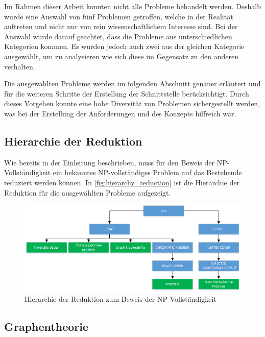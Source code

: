 Im Rahmen dieser Arbeit konnten nicht alle Probleme behandelt werden. Deshalb wurde eine Auswahl von fünf Problemen getroffen, welche in der Realität auftreten und nicht nur von rein 
wissenschaftlichem Interesse sind. Bei der Auswahl wurde darauf geachtet, dass die Probleme aus unterschiedlichen Kategorien kommen. Es wurden jedoch auch zwei aus der gleichen 
Kategorie ausgewählt, um zu analysieren wie sich diese im Gegensatz zu den anderen verhalten. 

Die ausgewählten Probleme werden im folgenden Abschnitt genauer erläutert und für die weiteren Schritte der Erstellung der Schnittstelle berücksichtigt. Durch dieses Vorgehen konnte eine 
hohe Diversität von Problemen sichergestellt werden, was bei der Erstellung der Anforderungen und des Konzepts hilfreich war.

\subsection{Hierarchie der Reduktion}\label{hierarchy_reduction}
Wie bereits in der Einleitung beschrieben, muss für den Beweis der NP-Vollständigkeit ein bekanntes NP-vollständiges Problem auf das Bestehende reduziert werden können. In 
\autoref{fig:hierarchy_reduction} ist die Hierarchie der Reduktion für die ausgewählten Probleme aufgezeigt.

\begin{figure}[h]
\centering 
\includegraphics[scale=0.75]{images/visio/problem_hierarchy.png}
\caption[Hierarchie der Reduktion zum Beweis der NP-Vollständigkeit]{Hierarchie der Reduktion zum Beweis der NP-Vollständigkeit }
\label{fig:hierarchy_reduction}
\end{figure}

\subsection{Graphentheorie}\label{graph_theory}

